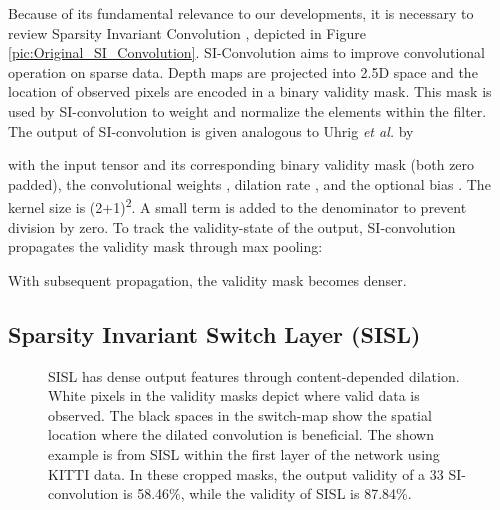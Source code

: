 \documentclass[letterpaper, 10 pt, conference]{ieeeconf}  \usepackage{geometry}
\begin{document}
Because of its fundamental relevance to our developments, it is necessary to review Sparsity Invariant Convolution \cite{uhrig2017sparsity}, depicted in Figure \ref{pic:Original_SI_Convolution}. SI-Convolution aims to improve convolutional operation on sparse data. Depth maps are projected into 2.5D space and the location of observed pixels are encoded in a binary validity mask. This mask is used by SI-convolution to weight and normalize the elements within the filter. The output  of SI-convolution is given analogous to Uhrig \textit{et al.} \cite{uhrig2017sparsity} by

 with the input tensor  and its corresponding binary validity mask  (both zero padded), the convolutional weights , dilation rate , and the optional bias . The kernel size is (2+1)\textsuperscript{2}. A small term  is added to the denominator to prevent division by zero. To track the validity-state of the output, SI-convolution propagates the validity mask through max pooling:

With subsequent propagation, the validity mask becomes denser.

\subsection{Sparsity Invariant Switch Layer (SISL)}
\begin{figure}[t]
	\centering
	\caption{SISL has dense output features through content-depended dilation. White pixels in the validity masks depict where valid data is observed. The black spaces in the switch-map show the spatial location where the dilated convolution is beneficial. The shown example is from SISL within the first layer of the network using KITTI data. In these cropped masks, the output validity of a 33 SI-convolution is 58.46\%, while the validity of SISL is 87.84\%.}
	\label{pic:Binary_Switch}
\end{figure}
\end{document}
